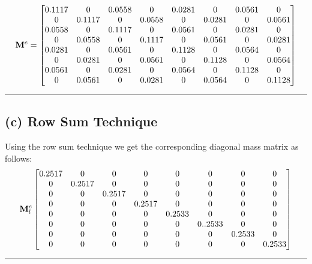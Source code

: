 \begin{align*}
{\bf M}^e = 
\begin{bmatrix}
 0.1117      &   0    &0.0558      &   0    &0.0281        & 0  &  0.0561   &      0 \\
         0   & 0.1117      &   0  &  0.0558 &        0  &  0.0281    &     0  &  0.0561 \\
    0.0558  &       0   & 0.1117    &     0  &  0.0561  &      0   & 0.0281     &    0 \\
         0  &  0.0558   &      0   & 0.1117   &      0  &  0.0561    &     0  &  0.0281 \\
    0.0281   &      0  &  0.0561    &     0 &   0.1128    &     0  &  0.0564  &       0 \\
         0 &   0.0281 &        0  &  0.0561   &      0  &  0.1128     &   0  &  0.0564 \\
    0.0561  &       0 &   0.0281  &       0   & 0.0564    &     0  &  0.1128  &       0 \\
         0  &  0.0561  &       0   & 0.0281 &        0  &  0.0564      &   0   & 0.1128
\end{bmatrix}
\end{align*}\hrule
\subsection*{(c) Row Sum Technique}
Using the row sum technique we get the corresponding diagonal mass matrix as follows: 
\begin{align*}
{\bf M}^e_l
\begin{bmatrix}
 0.2517 &    0  &   0  &   0  &   0  &   0  &   0  &   0\\
     0  &   0.2517   &  0   &  0   &  0   &  0   &  0   &  0\\
     0  &   0   &  0.2517   &  0   &  0   &  0   &  0   &  0\\
     0  &   0   &  0   &  0.2517   &  0   &  0   &  0   &  0\\
     0  &   0   &  0   &  0   &  0.2533   &  0   &  0   &  0\\
     0  &   0   &  0   &  0   &  0   &  0..2533   &  0   &  0\\
     0  &   0   &  0   &  0   &  0   &  0   &  0.2533   &  0\\     
     0  &   0   &  0   &  0   &  0   &  0   &  0   &  0.2533     
\end{bmatrix}
\end{align*}\hrule
